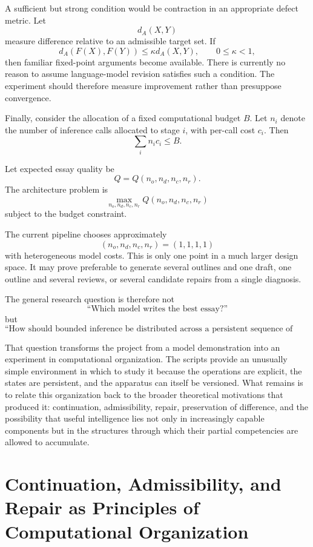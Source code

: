 \documentclass[11pt]{article}
\begin{document}
A sufficient but strong condition would be contraction in an appropriate defect metric. Let
\[
    d_A(X,Y)
\]
measure difference relative to an admissible target set. If
\[
    d_A(F(X),F(Y))
    \leq
    \kappa d_A(X,Y),
    \qquad
    0\leq\kappa<1,
\]
then familiar fixed-point arguments become available. There is currently no reason to assume language-model revision satisfies such a condition. The experiment should therefore measure improvement rather than presuppose convergence.

Finally, consider the allocation of a fixed computational budget \(B\). Let \(n_i\) denote the number of inference calls allocated to stage \(i\), with per-call cost \(c_i\). Then
\[
    \sum_i n_i c_i\leq B.
\]

Let expected essay quality be
\[
    Q
    =
    Q(n_o,n_d,n_c,n_r).
\]
The architecture problem is
\[
    \max_{n_o,n_d,n_c,n_r}
    Q(n_o,n_d,n_c,n_r)
\]
subject to the budget constraint.

The current pipeline chooses approximately
\[
    (n_o,n_d,n_c,n_r)
    =
    (1,1,1,1)
\]
with heterogeneous model costs. This is only one point in a much larger design space. It may prove preferable to generate several outlines and one draft, one outline and several reviews, or several candidate repairs from a single diagnosis.

The general research question is therefore not
\[
    \text{``Which model writes the best essay?''}
\]
but
\[
    \text{``How should bounded inference be distributed across a persistent
    sequence of heterogeneous cognitive operations?''}
\]

That question transforms the project from a model demonstration into an experiment in computational organization. The scripts provide an unusually simple environment in which to study it because the operations are explicit, the states are persistent, and the apparatus can itself be versioned. What remains is to relate this organization back to the broader theoretical motivations that produced it: continuation, admissibility, repair, preservation of difference, and the possibility that useful intelligence lies not only in increasingly capable components but in the structures through which their partial competencies are allowed to accumulate.

\section{Continuation, Admissibility, and Repair as Principles of Computational Organization}
\end{document}

